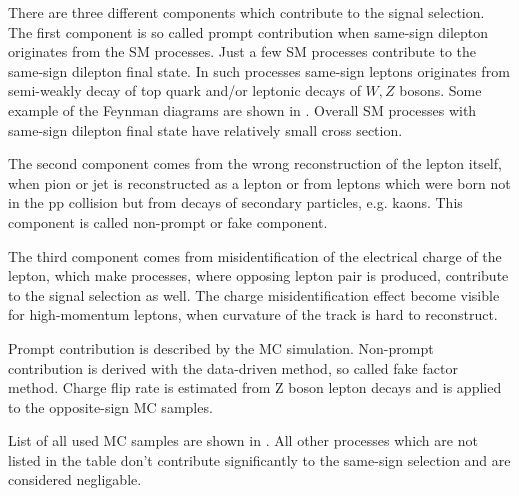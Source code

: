 There are three different components which contribute to the signal selection.
The first component is so called prompt contribution when same-sign dilepton originates from the SM processes.
Just a few SM processes contribute to the same-sign dilepton final state. In such processes same-sign leptons originates from semi-weakly decay of top quark
and/or leptonic decays of $W, Z$ bosons. Some example of the Feynman diagrams are shown in .
Overall SM processes with same-sign dilepton final state have relatively small cross section.

The second component comes from the wrong reconstruction of the lepton itself, when pion or jet is reconstructed as a lepton or from leptons which were born 
not in the pp collision but from decays of secondary particles, e.g. kaons. This component is called non-prompt or fake component.

The third component comes from misidentification of the electrical charge of the lepton, which make processes, where opposing lepton pair is produced, 
contribute to the signal selection as well. The charge misidentification effect become visible for high-momentum leptons, when curvature of the track 
is hard to reconstruct.

Prompt contribution is described by the MC simulation. 
Non-prompt contribution is derived with the data-driven method, so called fake factor method.
Charge flip rate is estimated from Z boson lepton decays and is applied to the opposite-sign MC samples.

List of all used MC samples are shown in . All other processes which are not listed in the table don't contribute
significantly to the same-sign selection and are considered negligable.

